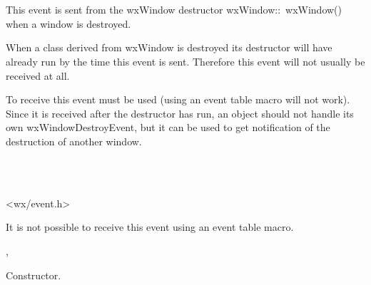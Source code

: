 \section{}\label{wxwindowdestroyevent}



This event is sent from the wxWindow destructor wxWindow::~wxWindow() when a
window is destroyed.

When a class derived from wxWindow is destroyed its destructor will have
already run by the time this event is sent. Therefore this event will not
usually be received at all.

To receive this event 
must be used (using an event table macro will not work). Since it is
received after the destructor has run, an object should not handle its
own wxWindowDestroyEvent, but it can be used to get notification of the
destruction of another window.


\\
\\


<wx/event.h>




%

It is not possible to receive this event using an event table macro.


,\rtfsp
{}


\label{wxwindowdestroyeventctor}


Constructor.

